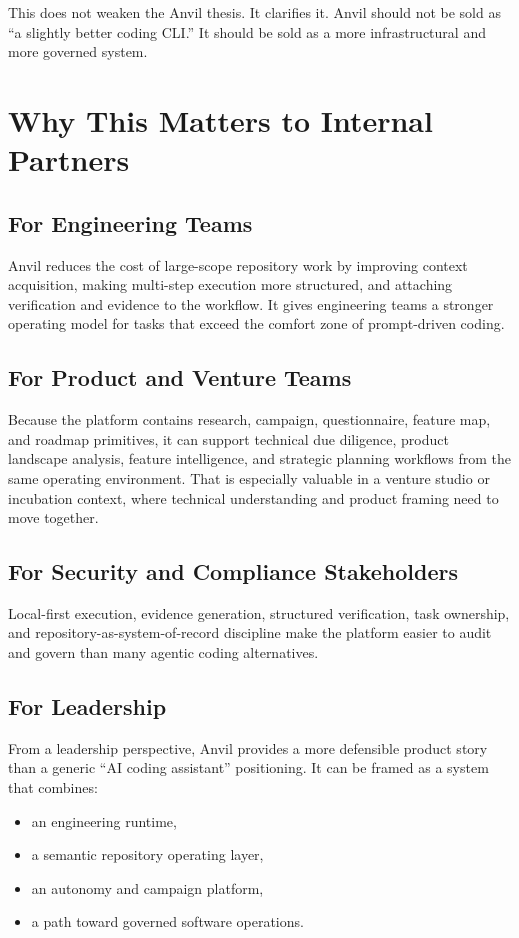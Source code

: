 \documentclass[11pt,a4paper]{article}
\begin{document}
This does not weaken the Anvil thesis. It clarifies it. Anvil should not be sold as ``a slightly better coding CLI.'' It should be sold as a more infrastructural and more governed system.

\section{Why This Matters to Internal Partners}
\subsection{For Engineering Teams}
Anvil reduces the cost of large-scope repository work by improving context acquisition, making multi-step execution more structured, and attaching verification and evidence to the workflow. It gives engineering teams a stronger operating model for tasks that exceed the comfort zone of prompt-driven coding.

\subsection{For Product and Venture Teams}
Because the platform contains research, campaign, questionnaire, feature map, and roadmap primitives, it can support technical due diligence, product landscape analysis, feature intelligence, and strategic planning workflows from the same operating environment. That is especially valuable in a venture studio or incubation context, where technical understanding and product framing need to move together.

\subsection{For Security and Compliance Stakeholders}
Local-first execution, evidence generation, structured verification, task ownership, and repository-as-system-of-record discipline make the platform easier to audit and govern than many agentic coding alternatives.

\subsection{For Leadership}
From a leadership perspective, Anvil provides a more defensible product story than a generic ``AI coding assistant'' positioning. It can be framed as a system that combines:
\begin{itemize}
    \item an engineering runtime,
    \item a semantic repository operating layer,
    \item an autonomy and campaign platform,
    \item a path toward governed software operations.
\end{itemize}
\end{document}
